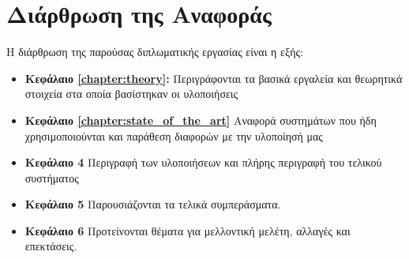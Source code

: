 \section{Διάρθρωση της Αναφοράς}
\label{section:layout}

Η διάρθρωση της παρούσας διπλωματικής εργασίας είναι η εξής:

\begin{itemize}
  \item{\textbf{Κεφάλαιο \ref{chapter:theory}:} 
		Περιγράφονται τα βασικά εργαλεία και θεωρητικά στοιχεία
		στα οποία βασίστηκαν οι υλοποιήσεις
    }
  \item{\textbf{Κεφάλαιο \ref{chapter:state_of_the_art}} Αναφορά συστημάτων που ήδη χρησιμοποιούνται	
		και παράθεση διαφορών με την υλοποίησή μας
    }
  \item{\textbf{Κεφάλαιο 4} Περιγραφή των υλοποιήσεων
  		και πλήρης περιγραφή του τελικού συστήματος
    }
  \item{\textbf{Κεφάλαιο 5} Παρουσιάζονται τα τελικά συμπεράσματα.
    }
  \item{\textbf{Κεφάλαιο 6} Προτείνονται θέματα για μελλοντική
      μελέτη, αλλαγές και επεκτάσεις.
    }
\end{itemize}
